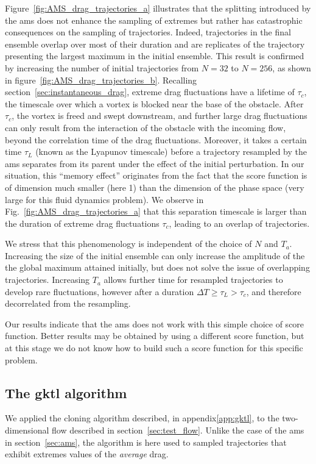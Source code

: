 Figure~\ref{fig:AMS_drag_trajectories_a} illustrates that the splitting introduced by the \ac{ams} does not enhance the sampling of extremes but rather has catastrophic consequences on the sampling of trajectories.
Indeed, trajectories in the final ensemble overlap over most of their duration and are replicates of the trajectory presenting the largest maximum in the initial ensemble.
This result is confirmed by increasing the number of initial trajectories from $N=32$ to $N=256$, as shown
in figure~\ref{fig:AMS_drag_trajectories_b}.
Recalling section~\ref{sec:instantaneous_drag}, extreme drag fluctuations have a lifetime of $\tau_c$, the timescale over which a vortex is blocked near the base of the obstacle.
After $\tau_c$, the vortex is freed and swept downstream, and further large drag fluctuations can only result from the interaction of the obstacle with the incoming flow, beyond the correlation time of the drag fluctuations.
Moreover, it takes a certain time $\tau_L$ (known as the Lyapunov timescale) before a trajectory resampled by the \ac{ams} separates from its parent under the effect of the initial perturbation.
In our situation, this ``memory effect'' originates from the fact that the score function is of dimension much smaller (here 1) than the dimension of the phase space (very large for this fluid dynamics problem).
%
We observe in Fig.~\ref{fig:AMS_drag_trajectories_a} that this separation timescale is larger than the duration of extreme drag fluctuations $\tau_c$, leading to an overlap of trajectories.

We stress that this phenomenology is independent of the choice of $N$ and $T_a$.
Increasing the size of the initial ensemble can only increase the amplitude of the the global maximum attained initially, but does not solve the issue of overlapping trajectories.
Increasing $T_a$ allows further time for resampled trajectories to develop rare fluctuations, however after a duration $\Delta T \geq \tau_L > \tau_c$, and therefore decorrelated from the resampling.

Our results indicate that the \ac{ams} does not work with this simple choice of score function.
Better results may be obtained by using a different score function, but at this stage we do not know how to build such a score function for this specific problem.

\subsection{The \ac{gktl} algorithm}
\label{sec:gktl}
We applied the cloning algorithm described, in appendix\ref{app:gktl}, to the two-dimensional flow described in section~\ref{sec:test_flow}.
Unlike the case of the \ac{ams} in section~\ref{sec:ams}, the algorithm is here used to sampled trajectories that exhibit extremes values of
the \emph{average} drag.

